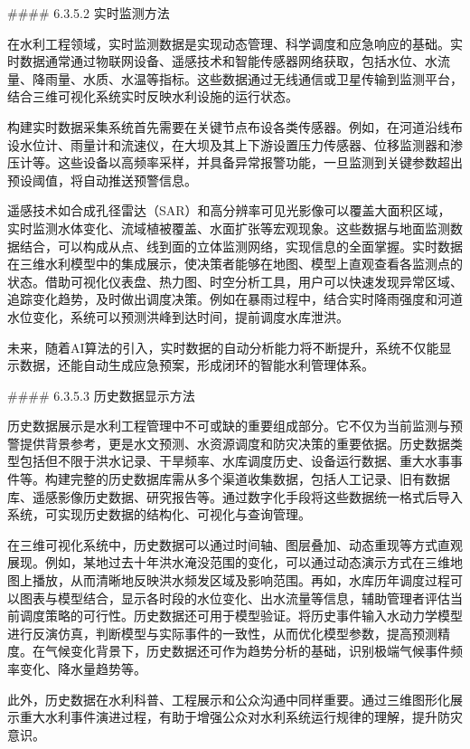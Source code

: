 \#\#\#\# 6.3.5.2 实时监测方法

在水利工程领域，实时监测数据是实现动态管理、科学调度和应急响应的基础。实时数据通常通过物联网设备、遥感技术和智能传感器网络获取，包括水位、水流量、降雨量、水质、水温等指标。这些数据通过无线通信或卫星传输到监测平台，结合三维可视化系统实时反映水利设施的运行状态。

构建实时数据采集系统首先需要在关键节点布设各类传感器。例如，在河道沿线布设水位计、雨量计和流速仪，在大坝及其上下游设置压力传感器、位移监测器和渗压计等。这些设备以高频率采样，并具备异常报警功能，一旦监测到关键参数超出预设阈值，将自动推送预警信息。

遥感技术如合成孔径雷达（SAR）和高分辨率可见光影像可以覆盖大面积区域，实时监测水体变化、流域植被覆盖、水面扩张等宏观现象。这些数据与地面监测数据结合，可以构成从点、线到面的立体监测网络，实现信息的全面掌握。实时数据在三维水利模型中的集成展示，使决策者能够在地图、模型上直观查看各监测点的状态。借助可视化仪表盘、热力图、时空分析工具，用户可以快速发现异常区域、追踪变化趋势，及时做出调度决策。例如在暴雨过程中，结合实时降雨强度和河道水位变化，系统可以预测洪峰到达时间，提前调度水库泄洪。

未来，随着AI算法的引入，实时数据的自动分析能力将不断提升，系统不仅能显示数据，还能自动生成应急预案，形成闭环的智能水利管理体系。

\#\#\#\# 6.3.5.3 历史数据显示方法

历史数据展示是水利工程管理中不可或缺的重要组成部分。它不仅为当前监测与预警提供背景参考，更是水文预测、水资源调度和防灾决策的重要依据。历史数据类型包括但不限于洪水记录、干旱频率、水库调度历史、设备运行数据、重大水事事件等。构建完整的历史数据库需从多个渠道收集数据，包括人工记录、旧有数据库、遥感影像历史数据、研究报告等。通过数字化手段将这些数据统一格式后导入系统，可实现历史数据的结构化、可视化与查询管理。

在三维可视化系统中，历史数据可以通过时间轴、图层叠加、动态重现等方式直观展现。例如，某地过去十年洪水淹没范围的变化，可以通过动态演示方式在三维地图上播放，从而清晰地反映洪水频发区域及影响范围。再如，水库历年调度过程可以图表与模型结合，显示各时段的水位变化、出水流量等信息，辅助管理者评估当前调度策略的可行性。历史数据还可用于模型验证。将历史事件输入水动力学模型进行反演仿真，判断模型与实际事件的一致性，从而优化模型参数，提高预测精度。在气候变化背景下，历史数据还可作为趋势分析的基础，识别极端气候事件频率变化、降水量趋势等。

此外，历史数据在水利科普、工程展示和公众沟通中同样重要。通过三维图形化展示重大水利事件演进过程，有助于增强公众对水利系统运行规律的理解，提升防灾意识。

